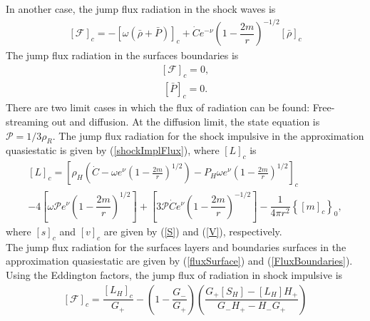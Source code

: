 \documentclass[notitlepage,letterpaper, 10pt]{article}
\begin{document}
In another case, the jump flux radiation in the shock waves is 
\begin{eqnarray}
   \left[\mathcal{F} \right]_{c}= - \left[ \omega \left(\bar{\rho}+ \bar{P} \right) \right]_{c}+ \dot{C}e^{-\nu}\left( 1-\dfrac{2m}{r}\right)^{-1/2}\left[\bar{\rho} \right]_{c}
\end{eqnarray}
The jump flux radiation in the surfaces boundaries is
\begin{eqnarray}
   \left[\mathcal{F} \right]_{c}=0, 
   \label{FluxBoundaries}
\end{eqnarray}
\begin{eqnarray}
    \left[ \bar{P} \right]_{c}=0.
\end{eqnarray}
There are two limit cases in which the flux of radiation can be found: Free-streaming out and diffusion.
At the diffusion limit, the state equation is $\mathcal{P} = 1/3 \rho_{R} $. The jump flux radiation for the shock impulsive in the approximation quasiestatic is given by (\ref{shockImplFlux}), where $\left[L \right]_{c}$ is
\begin{eqnarray}
\left[L \right]_{c} = \left[ \rho_{H}\left(  \dot{C}- \omega e^{\nu}\left(1-\frac{2m}{r} \right)^{1/2}\right) - P_{H}\omega e^{\nu}\left(1-\frac{2m}{r} \right)^{1/2}\right]_{c}\nonumber\\ - 4\left[\omega \mathcal{P}e^{\nu} \left( 1-\dfrac{2m}{r}\right)^{1/2} \right] + \left[ 3\mathcal{P} \dot{C}e^{\nu}\left( 1-\dfrac{2m}{r}\right)^{-1/2}\right] -  \dfrac{1}{4\pi r^{2}} \left\lbrace \left[ m \right]_c \right\rbrace_0,
\end{eqnarray}
where $\left[ s\right]_{c}$ and $\left[ v\right]_{c}$ are given by (\ref{S}) and (\ref{V}), respectively. \\ The jump flux radiation for the surfaces layers and boundaries surfaces in the approximation quasiestatic are given by (\ref{fluxSurface}) and (\ref{FluxBoundaries}).\\ 
Using the Eddington factors, the jump flux of radiation in shock impulsive is 
\begin{eqnarray}
\left[ \mathcal{F} \right]_{c}= \dfrac{\left[ L_{H} \right]_{c}}{G_{+}}- \left(1- \dfrac{G_{-}}{G_{+}} \right)\left( \dfrac{G_{+}\left[S_{H}\right]- \left[L_{H} \right]H_{+}}{G_{-}H_{+}-H_{-}G_{+}}  \right)
\end{eqnarray}
\end{document}
